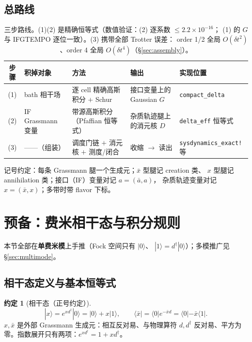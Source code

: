 \documentclass[11pt,a4paper]{ctexart}
\theoremstyle{plain}
\theoremstyle{definition}
\newtheorem{convention}[identity]{约定}
\theoremstyle{remark}
\begin{document}
\subsection{总路线}

\begin{table}[htbp]
\centering
\begin{tabular}{cllll}
\toprule
步骤 & 积掉对象 & 方法 & 输出 & 实现位置 \\
\midrule
(1) & bath 相干场 & 逐 cell 精确高斯积分 $+$ Schur & 接口变量上的 Gaussian $G$ & \texttt{compact\_delta} \\
(2) & IF Grassmann 变量 & 带源高斯积分（Pfaffian 恒等式） & 杂质轨迹腿上的消元核 $D$ & \texttt{delta\_eff} 恒等式 \\
(3) & ——（组装） & 调度门链 $+$ 消元核 $+$ 测度/闭合 & 收缩 $\to$ 读出 & \texttt{sysdynamics\_exact!} 等 \\
\bottomrule
\end{tabular}
\caption{三步路线。(1)(2) 是精确恒等式（数值验证：(2) 逐系数 $\le 2.2\times10^{-16}$；
(1) 的 $G$ 与 IFGTEMPO 逐位一致）。(3) 携带全部 Trotter 误差：
order 1/2 全局 $O(\delta t^2)$、order 4 全局 $O(\delta t^4)$（\S\ref{sec:assembly}）。}
\end{table}

记号约定：每条 Grassmann 腿一个生成元；$\bar x$ 型腿记 creation 类、
$x$ 型腿记 annihilation 类；接口（IF）变量对记 $a = (\bar a, a)$，
杂质轨迹变量对记 $x = (\bar x, x)$；多带时带 flavor 下标。

\section{预备：费米相干态与积分规则}

本节全部在\textbf{单费米模}上手推（Fock 空间只有 $|0\rangle$、
$|1\rangle = d^\dagger|0\rangle$）；多模推广见 \S\ref{sec:multimode}。

\subsection{相干态定义与基本恒等式}

\begin{convention}[相干态（正号约定）]
\begin{equation}
|x\rangle = e^{x d^\dagger}|0\rangle = |0\rangle + x|1\rangle,
\qquad
\langle\bar x| = \langle0| e^{-\bar x d} = \langle0| - \bar x\langle1|.
\label{eq:coh}
\end{equation}
$x, \bar x$ 是外部 Grassmann 生成元：相互反对易、与物理算符 $d, d^\dagger$
反对易、平方为零。指数展开只有两项：$e^{xd^\dagger} = 1 + xd^\dagger$。
\end{convention}
\end{document}
